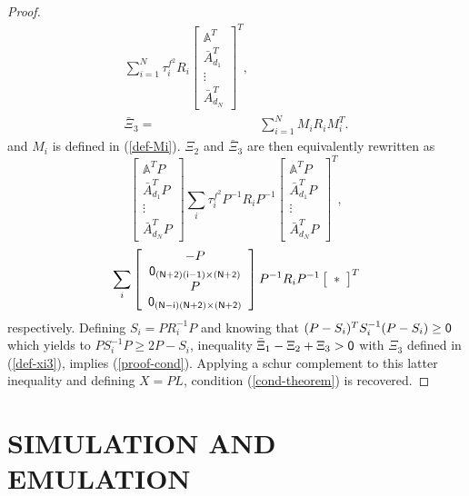 \documentclass[a4paper, 10pt, onecolumn]{article}
\newtheorem{proof}{Proof}
\begin{document}
\begin{proof}
\begin{equation*}
\begin{aligned}
\sum_{i=1}^N\tau^{f^2}_iR_i\left[\begin{array}{c}\mathbb{A}^T\\\bar{A}^T_{d_1}\\ \vdots\\\bar{A}^T_{d_N}\end{array}\right]^T,\\
\bar\Xi_3=&\sum_{i=1}^NM_iR_iM_i^T.
\end{aligned}
\end{equation*}
and $M_i$ is defined in (\ref{def-Mi}). $\Xi_2$ and $\bar\Xi_3$ are then equivalently rewritten as
\begin{equation*}
\left[\begin{array}{c}\mathbb{A}^TP\\\bar{A}^T_{d_1}P\\ \vdots\\\bar{A}^T_{d_N}P\end{array}\right]
\sum_i\tau^{f^2}_iP^{-1}R_iP^{-1}\left[\begin{array}{c}\mathbb{A}^TP\\\bar{A}^T_{d_1}P\\ \vdots\\\bar{A}^T_{d_N}P\end{array}\right]^T,
\end{equation*}
\begin{equation*}
\sum_i\left[\begin{array}{c}-P\\ \sf{0}_{(N+2)(i-1)\times(N+2)} \\ P \\ \sf{0}_{(N-i)(N+2)\times(N+2)}\end{array}\right]
P^{-1}R_iP^{-1}\left[\begin{array}{c}\ast\end{array}\right]^T
\end{equation*}
respectively. Defining $S_i=PR_i^{-1}P$ and knowing that $(P-S_i)^TS_i^{-1}(P-S_i)\geq\sf{0}$ which yields to $PS_i^{-1}P\geq 2P-S_i$, inequality $\bar\Xi_1-\Xi_2+\Xi_3> \sf{0}$ with $\Xi_3$ defined in (\ref{def-xi3}),
implies (\ref{proof-cond}). Applying a schur complement to this latter inequality and defining $X=PL$, condition (\ref{cond-theorem}) is recovered.
\end{proof}
 
\section{SIMULATION AND EMULATION}
\end{document}
